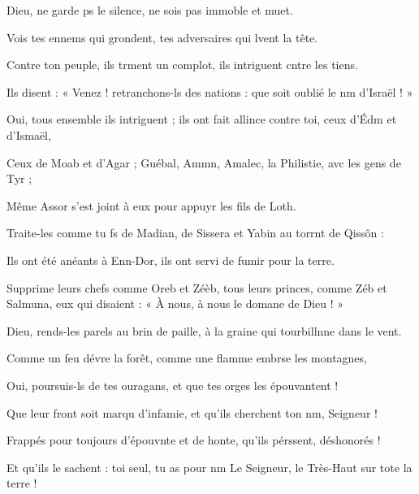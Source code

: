 \item Dieu, ne garde ps le silence, ne sois pas immoble et muet.
\item Vois tes ennems qui grondent, tes adversaires qui lvent la tête.
\item Contre ton peuple, ils trment un complot, ils intriguent cntre les tiens.
\item Ils disent : « Venez ! retranchons-ls des nations : que soit oublié le nm d'Israël ! »
\item Oui, tous ensemble ils intriguent ; ils ont fait allince contre toi, ceux d'Édm et d'Ismaël,
\item Ceux de Moab et d'Agar ; Guébal, Ammn, Amalec, la Philistie, avc les gens de Tyr ;
\item Même Assor s'est joint à eux pour appuyr les fils de Loth.
\item Traite-les comme tu fs de Madian, de Sissera et Yabin au torrnt de Qissôn :
\item Ils ont été anéants à Enn-Dor, ils ont servi de fumir pour la terre.
\item Supprime leurs chefs comme Oreb et Zéèb, tous leurs princes, comme Zéb et Salmuna, eux qui disaient : « À nous, à nous le domane de Dieu ! »
\item Dieu, rends-les parels au brin de paille, à la graine qui tourbillnne dans le vent.
\item Comme un feu dévre la forêt, comme une flamme embrse les montagnes,
\item Oui, poursuis-ls de tes ouragans, et que tes orges les épouvantent !
\item Que leur front soit marqu d'infamie, et qu'ils cherchent ton nm, Seigneur !
\item Frappés pour toujours d'épouvnte et de honte, qu'ils pérssent, déshonorés !
\item Et qu'ils le sachent : toi seul, tu as pour nm Le Seigneur, le Très-Haut sur tote la terre !